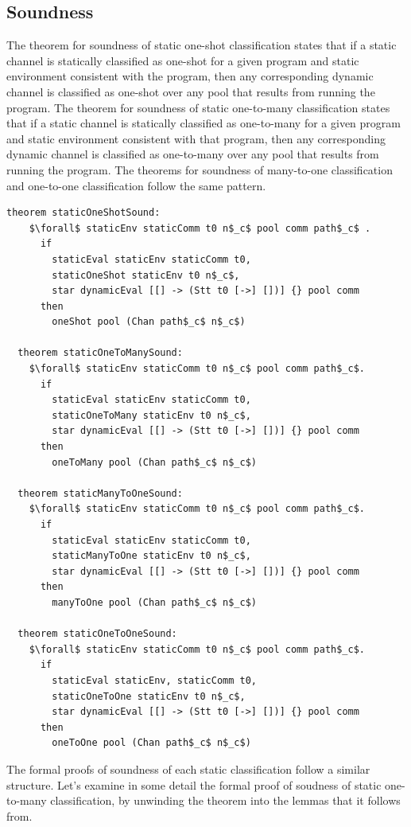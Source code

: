 \documentclass[letterpaper, 11pt]{extarticle}
\begin{document}
\subsection{Soundness}

The theorem for soundness of static one-shot classification states that if a static channel is
statically classified as one-shot for a given program and
static environment consistent with the
program, then any corresponding dynamic channel is classified
as one-shot over any pool that results
from running the program. The theorem for soundness of
static one-to-many classification states that if
a static channel is statically classified as one-to-many for a given program and static environment
consistent with that program, then any corresponding dynamic channel is classified as one-to-many
over any pool that results from running the program.  The theorems for soundness of many-to-one
classification and one-to-one classification follow the same pattern. 

\begin{lstlisting}[language=logic, mathescape]
  theorem staticOneShotSound: 
    $\forall$ staticEnv staticComm t0 n$_c$ pool comm path$_c$ .
      if
        staticEval staticEnv staticComm t0, 
        staticOneShot staticEnv t0 n$_c$, 
        star dynamicEval [[] -> (Stt t0 [->] [])] {} pool comm
      then
        oneShot pool (Chan path$_c$ n$_c$)

  theorem staticOneToManySound:
    $\forall$ staticEnv staticComm t0 n$_c$ pool comm path$_c$. 
      if 
        staticEval staticEnv staticComm t0, 
        staticOneToMany staticEnv t0 n$_c$, 
        star dynamicEval [[] -> (Stt t0 [->] [])] {} pool comm
      then
        oneToMany pool (Chan path$_c$ n$_c$)

  theorem staticManyToOneSound:
    $\forall$ staticEnv staticComm t0 n$_c$ pool comm path$_c$. 
      if
        staticEval staticEnv staticComm t0, 
        staticManyToOne staticEnv t0 n$_c$, 
        star dynamicEval [[] -> (Stt t0 [->] [])] {} pool comm
      then
        manyToOne pool (Chan path$_c$ n$_c$)

  theorem staticOneToOneSound:
    $\forall$ staticEnv staticComm t0 n$_c$ pool comm path$_c$. 
      if
        staticEval staticEnv, staticComm t0, 
        staticOneToOne staticEnv t0 n$_c$,
        star dynamicEval [[] -> (Stt t0 [->] [])] {} pool comm
      then
        oneToOne pool (Chan path$_c$ n$_c$)
\end{lstlisting}

The formal proofs of soundness of each static classification follow a similar structure.
Let's examine in some detail the formal proof of soudness of static one-to-many classification,
by unwinding the theorem into the lemmas that it follows from.
\end{document}
